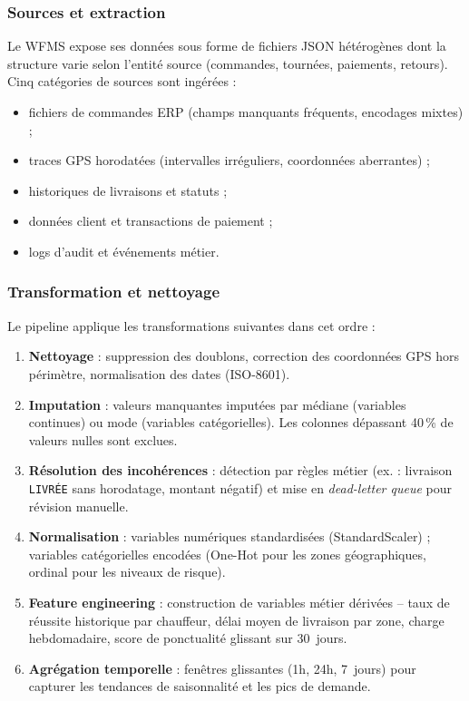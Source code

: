 \subsubsection{Sources et extraction}

Le WFMS expose ses données sous forme de fichiers JSON hétérogènes dont la structure varie selon l'entité source (commandes, tournées, paiements, retours). Cinq catégories de sources sont ingérées :

\begin{itemize}
  \item fichiers de commandes ERP (champs manquants fréquents, encodages mixtes) ;
  \item traces GPS horodatées (intervalles irréguliers, coordonnées aberrantes) ;
  \item historiques de livraisons et statuts ;
  \item données client et transactions de paiement ;
  \item logs d'audit et événements métier.
\end{itemize}

\subsubsection{Transformation et nettoyage}

Le pipeline applique les transformations suivantes dans cet ordre :

\begin{enumerate}
  \item \textbf{Nettoyage} : suppression des doublons, correction des coordonnées GPS hors périmètre, normalisation des dates (ISO-8601).
  \item \textbf{Imputation} : valeurs manquantes imputées par médiane (variables continues) ou mode (variables catégorielles). Les colonnes dépassant 40\,\% de valeurs nulles sont exclues.
  \item \textbf{Résolution des incohérences} : détection par règles métier (ex. : livraison \texttt{LIVRÉE} sans horodatage, montant négatif) et mise en \textit{dead-letter queue} pour révision manuelle.
  \item \textbf{Normalisation} : variables numériques standardisées (StandardScaler) ; variables catégorielles encodées (One-Hot pour les zones géographiques, ordinal pour les niveaux de risque).
  \item \textbf{Feature engineering} : construction de variables métier dérivées -- taux de réussite historique par chauffeur, délai moyen de livraison par zone, charge hebdomadaire, score de ponctualité glissant sur 30~jours.
  \item \textbf{Agrégation temporelle} : fenêtres glissantes (1h, 24h, 7~jours) pour capturer les tendances de saisonnalité et les pics de demande.
\end{enumerate}


